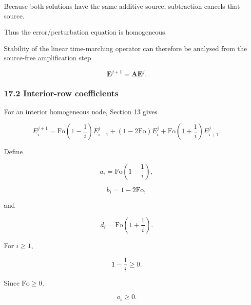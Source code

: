 \documentclass[11pt,a4paper]{article}
\begin{document}
Because both solutions have the same additive source, subtraction cancels that source.

Thus the error/perturbation equation is homogeneous.

Stability of the linear time-marching operator can therefore be analysed from the source-free amplification step

\begin{equation}
\mathbf E^{j+1}
=
\mathbf A\mathbf E^j.
\tag{TRISO-DIS-501}
\label{eq:triso-dis-501}
\end{equation}

\subsubsection*{17.2 Interior-row coefficients}

For an interior homogeneous node, Section 13 gives

\begin{equation}
E_i^{j+1}
=
\mathrm{Fo}
\left(
1-\frac1i
\right)
E_{i-1}^j
+
(1-2\mathrm{Fo})E_i^j
+
\mathrm{Fo}
\left(
1+\frac1i
\right)
E_{i+1}^j.
\tag{TRISO-DIS-502}
\label{eq:triso-dis-502}
\end{equation}

Define

\begin{equation}
a_i
=
\mathrm{Fo}
\left(
1-\frac1i
\right),
\tag{TRISO-DIS-503}
\label{eq:triso-dis-503}
\end{equation}

\begin{equation}
b_i
=
1-2\mathrm{Fo},
\tag{TRISO-DIS-504}
\label{eq:triso-dis-504}
\end{equation}

and

\begin{equation}
d_i
=
\mathrm{Fo}
\left(
1+\frac1i
\right).
\tag{TRISO-DIS-505}
\label{eq:triso-dis-505}
\end{equation}

For $i\ge1$,

\begin{equation}
1-\frac1i\ge0.
\tag{TRISO-DIS-506}
\label{eq:triso-dis-506}
\end{equation}

Since $\mathrm{Fo}\ge0$,

\begin{equation}
a_i\ge0.
\tag{TRISO-DIS-507}
\label{eq:triso-dis-507}
\end{equation}
\end{document}
